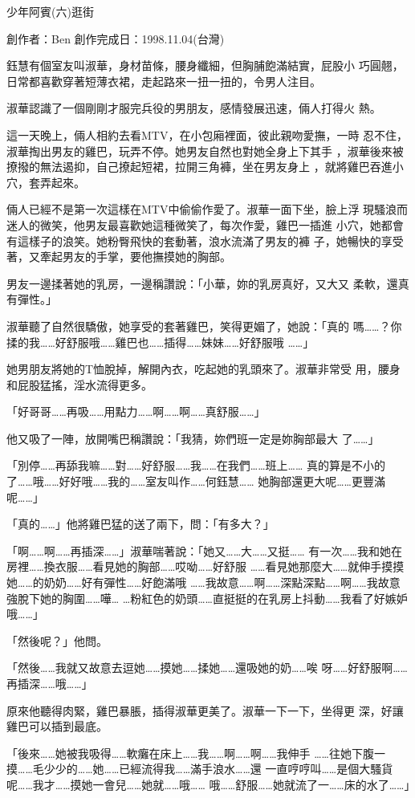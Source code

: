 



少年阿賓(六)逛街

創作者：Ben
創作完成日：1998.11.04(台灣)


鈺慧有個室友叫淑華，身材苗條，腰身纖細，但胸脯飽滿結實，屁股小
巧圓翹，日常都喜歡穿著短薄衣裙，走起路來一扭一扭的，令男人注目。

淑華認識了一個剛剛才服完兵役的男朋友，感情發展迅速，倆人打得火
熱。

這一天晚上，倆人相約去看MTV，在小包廂裡面，彼此親吻愛撫，一時
忍不住，淑華掏出男友的雞巴，玩弄不停。她男友自然也對她全身上下其手
，淑華後來被撩撥的無法遏抑，自己撩起短裙，拉開三角褲，坐在男友身上
，就將雞巴吞進小穴，套弄起來。

倆人已經不是第一次這樣在MTV中偷偷作愛了。淑華一面下坐，臉上浮
現騷浪而迷人的微笑，他男友最喜歡她這種微笑了，每次作愛，雞巴一插進
小穴，她都會有這樣子的浪笑。她粉臀飛快的套動著，浪水流滿了男友的褲
子，她暢快的享受著，又牽起男友的手掌，要他撫摸她的胸部。

男友一邊揉著她的乳房，一邊稱讚說：「小華，妳的乳房真好，又大又
柔軟，還真有彈性。」

淑華聽了自然很驕傲，她享受的套著雞巴，笑得更媚了，她說：「真的
嗎……？你揉的我……好舒服哦……雞巴也……插得……妹妹……好舒服哦
……」

她男朋友將她的T恤脫掉，解開內衣，吃起她的乳頭來了。淑華非常受
用，腰身和屁股猛搖，淫水流得更多。

「好哥哥……再吸……用點力……啊……啊……真舒服……」

他又吸了一陣，放開嘴巴稱讚說：「我猜，妳們班一定是妳胸部最大
了……」

「別停……再舔我嘛……對……好舒服……我……在我們……班上……
真的算是不小的了……哦……好好哦……我的……室友叫作……何鈺慧……
她胸部還更大呢……更豐滿呢……」

「真的……」他將雞巴猛的送了兩下，問：「有多大？」

「啊……啊……再插深……」淑華喘著說：「她又……大……又挺……
有一次……我和她在房裡……換衣服……看見她的胸部……哎呦……好舒服
……看見她那麼大……就伸手摸摸她……的奶奶……好有彈性……好飽滿哦
……我故意……啊……深點深點……啊……我故意強脫下她的胸圍……嘩…
…粉紅色的奶頭……直挺挺的在乳房上抖動……我看了好嫉妒哦……」

「然後呢？」他問。

「然後……我就又故意去逗她……摸她……揉她……還吸她的奶……唉
呀……好舒服啊……再插深……哦……」

原來他聽得肉緊，雞巴暴脹，插得淑華更美了。淑華一下一下，坐得更
深，好讓雞巴可以插到最底。

「後來……她被我吸得……軟癱在床上……我……啊……啊……我伸手
……往她下腹一摸……毛少少的……她……已經流得我……滿手浪水……還
一直哼哼叫……是個大騷貨呢……我才……摸她一會兒……她就……哦……
哦……舒服……她就流了一……床的水了……」

